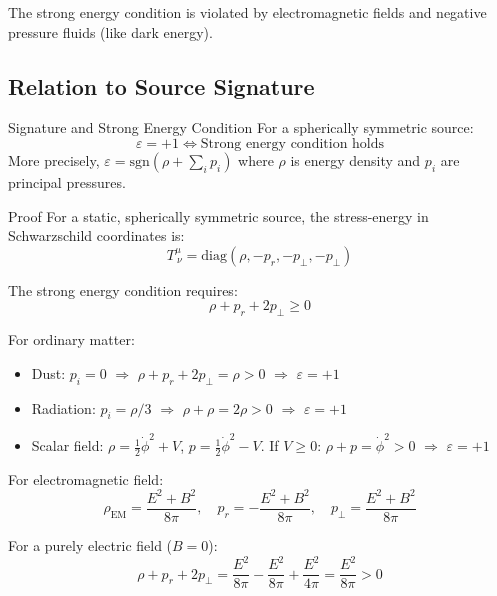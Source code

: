 \documentclass[11pt,a4paper]{article}
\theoremstyle{definition}
\theoremstyle{remark}
\begin{document}
	The strong energy condition is violated by electromagnetic fields and negative pressure fluids (like dark energy).
	
	\subsection{Relation to Source Signature}
	
	Signature and Strong Energy Condition
		\label{thm:signature_sec}
		For a spherically symmetric source:
		\begin{equation}
			\varepsilon = +1 \iff \text{Strong energy condition holds}
		\end{equation}
		More precisely, $\varepsilon = \text{sgn}(\rho + \sum_i p_i)$ where $\rho$ is energy density and $p_i$ are principal pressures.
	
	Proof
		For a static, spherically symmetric source, the stress-energy in Schwarzschild coordinates is:
		\begin{equation}
			T^\mu_{~\nu} = \text{diag}(\rho, -p_r, -p_\perp, -p_\perp)
		\end{equation}
		
		The strong energy condition requires:
		\begin{equation}
			\rho + p_r + 2p_\perp \geq 0
		\end{equation}
		
		For ordinary matter:
		\begin{itemize}
			\item Dust: $p_i = 0$ $\Rightarrow$ $\rho + p_r + 2p_\perp = \rho > 0$ $\Rightarrow$ $\varepsilon = +1$
			\item Radiation: $p_i = \rho/3$ $\Rightarrow$ $\rho + \rho = 2\rho > 0$ $\Rightarrow$ $\varepsilon = +1$
			\item Scalar field: $\rho = \frac{1}{2}\dot{\phi}^2 + V$, $p = \frac{1}{2}\dot{\phi}^2 - V$. If $V \geq 0$: $\rho + p = \dot{\phi}^2 > 0$ $\Rightarrow$ $\varepsilon = +1$
		\end{itemize}
		
		For electromagnetic field:
		\begin{equation}
			\rho_{\text{EM}} = \frac{E^2 + B^2}{8\pi}, \quad p_r = -\frac{E^2 + B^2}{8\pi}, \quad p_\perp = \frac{E^2 + B^2}{8\pi}
		\end{equation}
		
		For a purely electric field ($B = 0$):
		\begin{equation}
			\rho + p_r + 2p_\perp = \frac{E^2}{8\pi} - \frac{E^2}{8\pi} + \frac{E^2}{4\pi} = \frac{E^2}{8\pi} > 0
		\end{equation}
		
\end{document}
